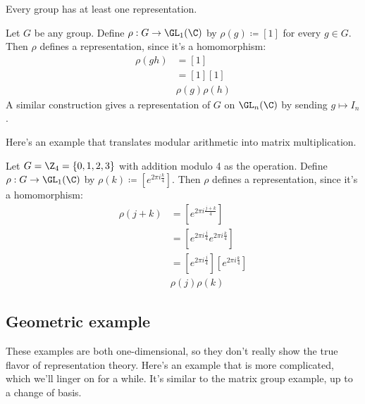 Every group has at least one representation.

\begin{example}
    Let $G$ be any group.
    Define $\rho:G\to \GL_1(\C)$ by $\rho(g) \coloneq [1]$ for every $g\in G$.
    Then $\rho$ defines a representation, since it's a homomorphism:
    \begin{align*}
        \rho(gh) & = [1] \\
        & = [1][1] \\
        & \rho(g) \rho(h)
    \end{align*}
    A similar construction gives a representation of $G$ on $\GL_n(\C)$ by sending $g\mapsto I_n$.
\end{example}

Here's an example that translates modular arithmetic into matrix multiplication.

\begin{example}
    Let $G = \Z_4 = \{ 0,1,2,3 \}$ with addition modulo 4 as the operation.
    Define $\rho:G\to \GL_1(\C)$ by $\rho(k) \coloneq [e^{2\pi i \frac{k}{4}}]$.
    Then $\rho$ defines a representation, since it's a homomorphism:
    \begin{align*}
        \rho(j+k) & = [ e^{2\pi i \frac{j+k}{4}} ] \\
        & = [ e^{2\pi i \frac{j}{4}} e^{2\pi i \frac{k}{4}} ] \\
        & = [ e^{2\pi i \frac{j}{4}} ][ e^{2\pi i \frac{k}{4}} ] \\
        & \rho(j) \rho(k)
    \end{align*}
\end{example}


\subsection{Geometric example}
These examples are both one-dimensional, so they don't really show the true flavor of representation theory. 
Here's an example that is more complicated, which we'll linger on for a while.
It's similar to the matrix group example, up to a change of basis.

